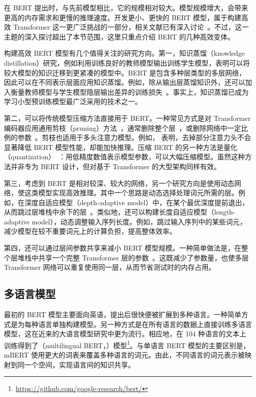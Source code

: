 \noindent 在 BERT 提出时，与先前模型相比，它的规模相对较大。模型规模增大，会带来更高的内存需求和更慢的推理速度。开发更小、更快的 BERT 模型，属于构建高效 Transformer 这一更广泛挑战的一部分，相关文献已有深入讨论~\cite{Tay-etal:2020efficient,xiao-and-zhu:2023introduction}。不过，这一主题的深入探讨超出了本节范围，这里只重点介绍 BERT 的几种高效变体。

构建高效 BERT 模型有几个值得关注的研究方向。第一，知识蒸馏（knowledge distillation）研究，例如利用训练良好的教师模型输出训练学生模型，表明可以将较大模型的知识迁移到更紧凑的模型中。BERT 是包含多种层类型的多层网络，因此可以在不同表示层面应用知识蒸馏。例如，除从输出层蒸馏知识外，还可以加入衡量教师模型与学生模型隐层输出差异的训练损失~\cite{sun2020-etal:mobilebert,jiao-etal:2020tinybert}。事实上，知识蒸馏已成为学习小型预训练模型最广泛采用的技术之一。

第二，可以将传统模型压缩方法直接用于 BERT。一种常见方式是对 Transformer 编码器应用通用剪枝（pruning）方法~\cite{gale-etal:2019state}，通常删除整个层~\cite{fan-etal:2019reducing}，或删除网络中一定比例的参数~\cite{sanh-etal:2020movement,chen-etal:2020lottery}。剪枝也适用于多头注意力模型。例如，\citet{michel-etal:2019sixteen} 表明，去掉部分注意力头不会显著降低 BERT 模型性能，却能加快推理。压缩 BERT 的另一种方法是量化（quantization）~\cite{shen-etal:2020qbert}：用低精度数值表示模型参数，可以大幅压缩模型。虽然这种方法并非专为 BERT 设计，但对基于 Transformer 的大型架构同样有效。

第三，考虑到 BERT 是相对较深、较大的网络，另一个研究方向是使用动态网络，使这类模型实现高效推理。其中一个思路是动态选择处理词元所需的层。例如，在深度自适应模型（depth-adaptive model）中，在某个最优深度提前退出，从而跳过层堆栈中余下的层~\cite{xin-etal:2020deebert,zhou-etal:2020bert}。类似地，还可以构建长度自适应模型（length-adaptive model），动态调整输入序列长度。例如，跳过输入序列中的某些词元，减少模型在较不重要词元上的计算负担，提高整体效率。

第四，还可以通过层间参数共享来减小 BERT 模型规模。一种简单做法是，在整个层堆栈中共享一个完整 Transformer 层的参数~\cite{dehghani-etal:2018universal,lan-etal:2020albert}。这既减少了参数量，也使多层 Transformer 网络可以重复使用同一层，从而节省测试时的内存占用。

\subsection{多语言模型}

\noindent 最初的 BERT 模型主要面向英语，提出后很快便被扩展到多种语言。一种简单方式是为每种语言单独构建模型。另一种方式是在所有语言的数据上直接训练多语言模型，这在近来的大语言模型研究中更为流行。相应地，在 104 种语言的文本上训练得到了（multilingual BERT，）模型\footnote{\url{https://github.com/google-research/bert/}}。与单语言 BERT 模型的主要区别是，mBERT 使用更大的词表来覆盖多种语言的词元。由此，不同语言的词元表示被映射到同一个空间，实现语言间的知识共享。

